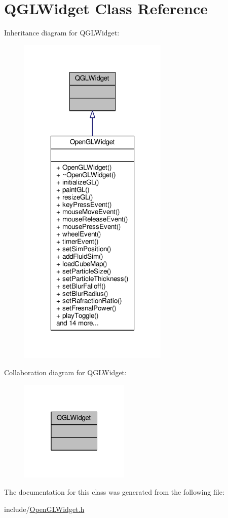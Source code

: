 \hypertarget{class_q_g_l_widget}{\section{Q\-G\-L\-Widget Class Reference}
\label{class_q_g_l_widget}
}


Inheritance diagram for Q\-G\-L\-Widget\-:
\nopagebreak
\begin{figure}[H]
\begin{center}
\leavevmode
\includegraphics[width=202pt]{class_q_g_l_widget__inherit__graph}
\end{center}
\end{figure}


Collaboration diagram for Q\-G\-L\-Widget\-:
\nopagebreak
\begin{figure}[H]
\begin{center}
\leavevmode
\includegraphics[width=148pt]{class_q_g_l_widget__coll__graph}
\end{center}
\end{figure}


The documentation for this class was generated from the following file\-:\begin{DoxyCompactItemize}
\item 
include/\hyperlink{_open_g_l_widget_8h}{Open\-G\-L\-Widget.\-h}\end{DoxyCompactItemize}
